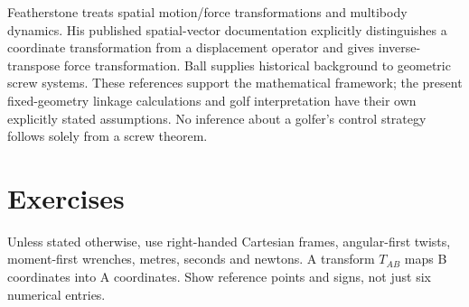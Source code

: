 Featherstone \cite{Featherstone2008} treats spatial motion/force transformations and multibody dynamics. His published spatial-vector documentation explicitly distinguishes a coordinate transformation from a displacement operator and gives inverse-transpose force transformation. Ball \cite{ball1900} supplies historical background to geometric screw systems. These references support the mathematical framework; the present fixed-geometry linkage calculations and golf interpretation have their own explicitly stated assumptions. No inference about a golfer's control strategy follows solely from a screw theorem.

\section{Exercises}
\label{sec:exercises_ch5}

Unless stated otherwise, use right-handed Cartesian frames, angular-first twists, moment-first wrenches, metres, seconds and newtons. A transform $T_{AB}$ maps B coordinates into A coordinates. Show reference points and signs, not just six numerical entries.

